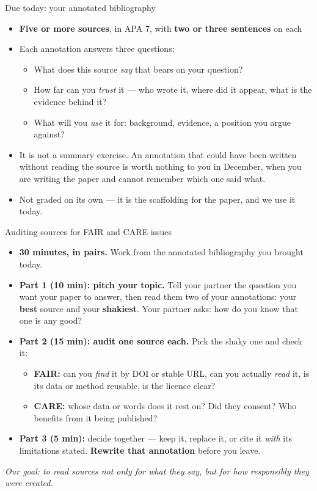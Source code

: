 \documentclass[aspectratio=169]{beamer}
\begin{document}
\begin{frame}{Due today: your annotated bibliography}
\begin{itemize}
  \item \textbf{Five or more sources}, in APA 7, with \textbf{two or three
    sentences} on each
  \item Each annotation answers three questions:
    \begin{itemize}
      \item What does this source \emph{say} that bears on your question?
      \item How far can you \emph{trust} it --- who wrote it, where did it
        appear, what is the evidence behind it?
      \item What will you \emph{use} it for: background, evidence, a position
        you argue against?
    \end{itemize}
  \item It is not a summary exercise.  An annotation that could have been
    written without reading the source is worth nothing to you in December,
    when you are writing the paper and cannot remember which one said what.
  \item Not graded on its own --- it is the scaffolding for the paper, and we
    use it today.
\end{itemize}
\end{frame}

\begin{frame}{Auditing sources for FAIR and CARE issues}
\begin{itemize}
  \item \textbf{30 minutes, in pairs.}  Work from the annotated bibliography
    you brought today.
  \item \textbf{Part 1 (10 min): pitch your topic.}  Tell your partner the
    question you want your paper to answer, then read them two of your
    annotations: your \textbf{best} source and your \textbf{shakiest}.  Your
    partner asks: how do you know that one is any good?
  \item \textbf{Part 2 (15 min): audit one source each.}  Pick the shaky one
    and check it:
    \begin{itemize}
      \item \textbf{FAIR:} can you \emph{find} it by DOI or stable URL, can you
        actually \emph{read} it, is its data or method reusable, is the licence clear?
      \item \textbf{CARE:} whose data or words does it rest on?  Did they
        consent?  Who benefits from it being published?
    \end{itemize}
  \item \textbf{Part 3 (5 min):} decide together --- keep it, replace it, or
    cite it \emph{with} its limitations stated.  \textbf{Rewrite that
    annotation} before you leave.
\end{itemize}
\textit{Our goal: to read sources not only for what they say, but for how responsibly they were created.}
\end{frame}
\end{document}
